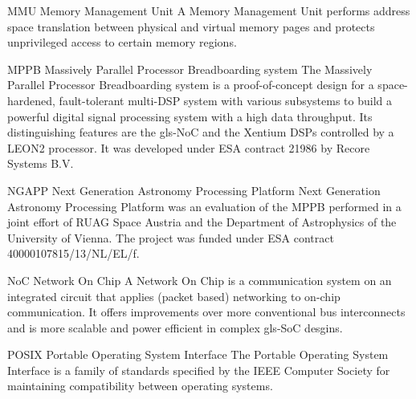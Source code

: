 

%
  {MMU}%
  {Memory Management Unit}%
  {A Memory Management Unit performs address space translation between physical
   and virtual memory pages and protects unprivileged access to certain memory
   regions.}%

%
  {MPPB}%
  {Massively Parallel Processor Breadboarding system}%
  {The Massively Parallel Processor Breadboarding system is a proof-of-concept %
   design for a space-hardened, fault-tolerant multi-DSP system with various %
   subsystems to build a powerful digital signal processing system with a high %
   data throughput. Its distinguishing features are the \gls{gls-NoC} and the
   \gls{Xentium} \glspl{DSP} controlled by a \gls{LEON2} processor.
   It was developed under ESA contract 21986 by Recore Systems B.V.}%


%
  {NGAPP}%
  {Next Generation Astronomy Processing Platform}%
  {Next Generation Astronomy Processing Platform was an evaluation of the
   \gls{MPPB} performed in a joint effort of RUAG Space Austria and the
   Department of Astrophysics of the University of Vienna.
   The project was funded under ESA contract 40000107815/13/NL/EL/f.}%

%
  {NoC}%
  {Network On Chip}%
  {A Network On Chip is a communication system on an integrated circuit that
   applies (packet based) networking to on-chip communication. It offers
   improvements over more conventional bus interconnects and is more scalable
   and power efficient in complex \gls{gls-SoC} desgins.}%




  {POSIX}
  {Portable Operating System Interface}
  {The Portable Operating System Interface is a family of standards specified
   by the IEEE Computer Society for maintaining compatibility between
   operating systems.}%

